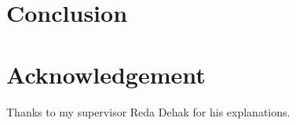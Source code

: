 \documentclass{techrep}
\begin{document}
\chapter*{Conclusion}

\chapter*{Acknowledgement}
Thanks to my supervisor Reda Dehak for his explanations.

 \nocite{*}
\end{document}

